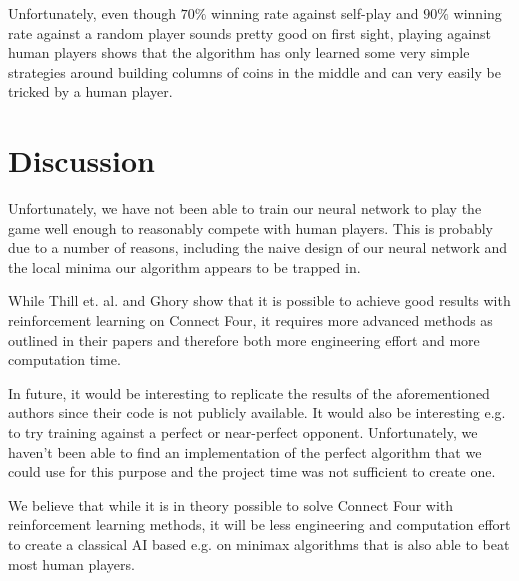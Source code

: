 \documentclass[10pt,twocolumn,letterpaper]{article}
\begin{document}
Unfortunately, even though $70\%$ winning rate against self-play and $90\%$ winning rate against a random player sounds pretty good on first sight, playing against human players shows that the algorithm has only learned some very simple strategies around building columns of coins in the middle and can very easily
be tricked by a human player.

\section{Discussion}


Unfortunately, we have not been able to train our neural network to play
the game well enough to reasonably compete with human players.
This is probably due to a number of reasons, including the naive design of
our neural network and the local minima our algorithm appears to be trapped in.

While Thill et. al. \cite{Thill} and Ghory \cite{Ghory} show that it is possible to
achieve good results with reinforcement learning on Connect Four, it requires
more advanced methods as outlined in their papers and therefore both more
engineering effort and more computation time.

In future, it would be interesting to replicate the results of the aforementioned
authors since their code is not publicly available.
It would also be interesting e.g. to try training against a perfect or near-perfect opponent.
Unfortunately, we haven't been able to find an implementation of the perfect algorithm that we could use for this purpose and the project time was not sufficient to create one.

We believe that while it is in theory possible to solve Connect Four with
reinforcement learning methods, it will be less engineering and computation
effort to create a classical AI based e.g. on minimax algorithms that is also
able to beat most human players.

{\small
\printbibliography
}
\end{document}
